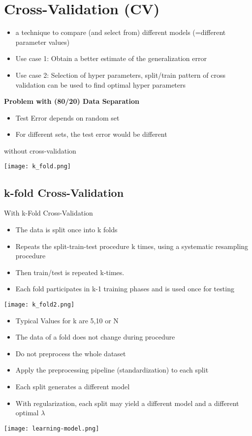 \section{Cross-Validation (CV)}

\begin{itemize}
    \item a technique to compare (and select from) different models (=different parameter values)
    \item Use case 1: Obtain a better estimate of the generalization error
    \item Use case 2: Selection of hyper parameters, split/train pattern of cross validation can be used to find optimal hyper parameters
\end{itemize}

\textbf{Problem with (80/20) Data Separation}
\begin{itemize}
    \item Test Error depends on random set
    \item For different sets, the test error would be different
\end{itemize}

without cross-validation

\texttt{[image: k\_fold.png]}

\subsection{k-fold Cross-Validation}

With k-Fold Cross-Validation\\

\begin{itemize}
    \item The data is split once into k folds
    \item Repeats the split-train-test procedure k times, using a systematic resampling procedure
    \item Then train/test is repeated k-times.
    \item Each fold participates in k-1 training phases and is used once for testing
\end{itemize}

\texttt{[image: k\_fold2.png]}

\begin{itemize}
    \item Typical Values for k are 5,10 or N
    \item The data of a fold does not change during procedure
    \item Do not preprocess the whole dataset
    \item Apply the preprocessing pipeline (standardization) to each split
    \item Each split generates a different model
    \item With regularization, each split may yield a different  model and a different optimal $\lambda$
\end{itemize}

\texttt{[image: learning-model.png]}
